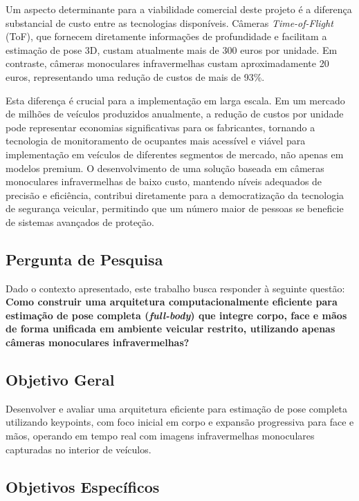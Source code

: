 \documentclass[12pt, a4paper]{article}
\begin{document}
Um aspecto determinante para a viabilidade comercial deste projeto é a diferença substancial de custo entre as tecnologias disponíveis. Câmeras \textit{Time-of-Flight} (ToF), que fornecem diretamente informações de profundidade e facilitam a estimação de pose 3D, custam atualmente mais de 300 euros por unidade. Em contraste, câmeras monoculares infravermelhas custam aproximadamente 20 euros, representando uma redução de custos de mais de 93\%.

Esta diferença é crucial para a implementação em larga escala. Em um mercado de milhões de veículos produzidos anualmente, a redução de custos por unidade pode representar economias significativas para os fabricantes, tornando a tecnologia de monitoramento de ocupantes mais acessível e viável para implementação em veículos de diferentes segmentos de mercado, não apenas em modelos premium. O desenvolvimento de uma solução baseada em câmeras monoculares infravermelhas de baixo custo, mantendo níveis adequados de precisão e eficiência, contribui diretamente para a democratização da tecnologia de segurança veicular, permitindo que um número maior de pessoas se beneficie de sistemas avançados de proteção.

\subsection{Pergunta de Pesquisa}

Dado o contexto apresentado, este trabalho busca responder à seguinte questão: \textbf{Como construir uma arquitetura computacionalmente eficiente para estimação de pose completa (\textit{full-body}) que integre corpo, face e mãos de forma unificada em ambiente veicular restrito, utilizando apenas câmeras monoculares infravermelhas?}

\subsection{Objetivo Geral}

Desenvolver e avaliar uma arquitetura eficiente para estimação de pose completa utilizando keypoints, com foco inicial em corpo e expansão progressiva para face e mãos, operando em tempo real com imagens infravermelhas monoculares capturadas no interior de veículos.

\subsection{Objetivos Específicos}
\end{document}

